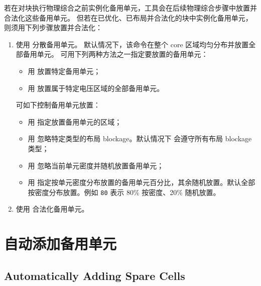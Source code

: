 若在对块执行物理综合之前实例化备用单元，工具会在后续物理综合步骤中放置并合法化这些备用单元。
但若在已优化、已布局并合法化的块中实例化备用单元，则须用下列步骤放置并合法化：
\begin{enumerate}
  \item 使用  分散备用单元。
  默认情况下，该命令在整个 core 区域均匀分布并放置全部备用单元。
  可用下列两种方法之一指定要放置的备用单元：
  \begin{itemize}
    \item 用  放置特定备用单元；
    \item 用  放置属于特定电压区域的全部备用单元。
  \end{itemize}
  可如下控制备用单元放置：
  \begin{itemize}
    \item 用  指定放置备用单元的区域；
    \item 用  忽略特定类型的布局 blockage。默认情况下  会遵守所有布局 blockage 类型；
    \item 用  忽略当前单元密度并随机放置备用单元；
    \item 用  指定按单元密度分布放置的备用单元百分比，其余随机放置。默认全部按密度分布放置。例如  \texttt{80} 表示 80\% 按密度、20\% 随机放置。
  \end{itemize}
  \item 使用    合法化备用单元。
\end{enumerate}

\section{自动添加备用单元}
\subsection*{Automatically Adding Spare Cells}

